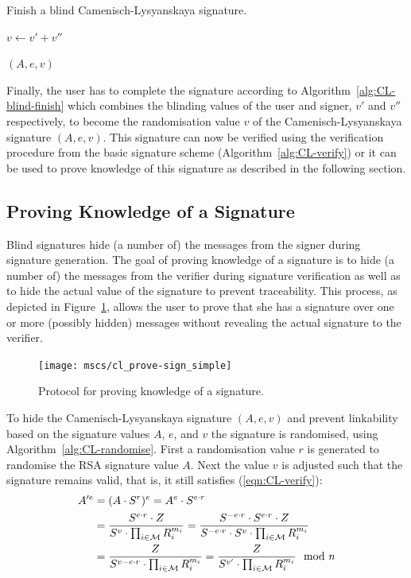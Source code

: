 \begin{algorithm}
  \caption{Finish a blind Camenisch-Lysyanskaya signature.}
  \label{alg:CL-blind-finish}
  \addtolength{\baselineskip}{1mm}
  \begin{algorithmic}[1]
      \State $v \gets v' + v''$

      \Return $(A, e, v)$
    \EndFunction
  \end{algorithmic}
\end{algorithm}

Finally, the user has to complete the signature according to
Algorithm~\ref{alg:CL-blind-finish} which combines the blinding values of the
user and signer, $v'$ and $v''$ respectively, to become the randomisation
value $v$ of the Camenisch-Lysyanskaya signature $(A, e, v)$. This signature can
now be verified using the verification procedure from the basic signature scheme
(Algorithm~\ref{alg:CL-verify}) or it can be used to prove knowledge of this
signature as described in the following section.


\subsection{Proving Knowledge of a Signature\label{sec:cl_proof}}

Blind signatures hide (a number of) the messages from the signer during
signature generation. The goal of proving knowledge of a signature is to hide
(a number of) the messages from the verifier during signature verification as
well as to hide the actual value of the signature to prevent traceability. This
process, as depicted in Figure~\ref{msc:cl_prove-sign}, allows the user to prove
that she has a signature over one or more (possibly hidden) messages without
revealing the actual signature to the verifier.

\begin{figure}[b]
  \centering
  \texttt{[image: mscs/cl\_prove-sign\_simple]}
  \caption{Protocol for proving knowledge of a signature.}
  \label{msc:cl_prove-sign}
\end{figure}

To hide the Camenisch-Lysyanskaya signature $(A, e, v)$ and prevent linkability
based on the signature values $A$, $e$, and $v$ the signature is randomised,
using Algorithm~\ref{alg:CL-randomise}. First a randomisation value $r$ is
generated to randomise the RSA signature value $A$. Next the value $v$ is
adjusted such that the signature remains valid, that is, it still satisfies
(\ref{eqn:CL-verify}):
\begin{align*}
  A'^e
  & = (A \cdot S^r)^e
  = A^e \cdot S^{e \cdot r} \\
  &= \dfrac{S^{e \cdot r} \cdot Z}{S^v \cdot \prod_{i \in \mathcal{M}} R_i^{m_i}}
  = \dfrac{S^{- e \cdot r} \cdot S^{e \cdot r} \cdot Z}{S^{- e \cdot r} \cdot S^v \cdot \prod_{i \in \mathcal{M}} R_i^{m_i}} \\
  &= \dfrac{Z}{S^{v - e \cdot r} \cdot \prod_{i \in \mathcal{M}} R_i^{m_i}}
  = \dfrac{Z}{S^{v'} \cdot \prod_{i \in \mathcal{M}} R_i^{m_i}} \mod n
\end{align*}

